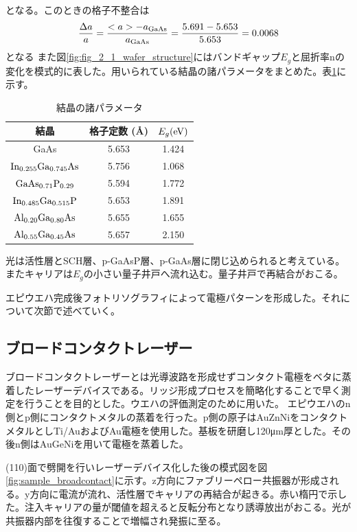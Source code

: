 となる。このときの格子不整合は
\begin{eqnarray}
\dfrac{\Delta a}{a}=\dfrac{<a> - a_{\rm{GaAs}}}{a_{\rm{GaAs}}}=\dfrac{5.691-5.653}{5.653}=0.0068
\end{eqnarray}
となる
また図\ref{fig:fig_2_1_wafer_structure}にはバンドギャップ$E_{g}$と屈折率nの変化を模式的に表した。用いられている結晶の諸パラメータをまとめた。表\ref{table:table_2_1_parameter}に示す。
\begin{table}[h]
  \caption{結晶の諸パラメータ}
    \label{table:table_2_1_parameter}
  \centering
  \begin{tabular}{ccc}
    \hline
      結晶&格子定数 (\AA) & $E_{g} (\rm{eV})$  \\
    \hline \hline
    GaAs  & 5.653&  1.424  \\
    $\rm{In_{0.255}Ga_{0.745}As}$&  5.756& 1.068  \\
    $\rm{GaAs_{0.71}P_{0.29}}$  &  5.594&1.772 \\
    $\rm{In_{0.485}Ga_{0.515}P}$& 5.653& 1.891\\
    $\rm{Al_{0.20}Ga_{0.80}As}$&5.655& 1.655\\
    $\rm{Al_{0.55}Ga_{0.45}As}$&5.657& 2.150\\
       \hline
  \end{tabular}
\end{table}

光は活性層とSCH層、p-GaAsP層、p-GaAs層に閉じ込められると考えている。またキャリアは$E_{g}$の小さい量子井戸へ流れ込む。量子井戸で再結合がおこる。

エピウエハ完成後フォトリソグラフィによって電極パターンを形成した。それについて次節で述べていく。

\subsection{ブロードコンタクトレーザー}%
ブロードコンタクトレーザーとは光導波路を形成せずコンタクト電極をベタに蒸着したレーザーデバイスである。リッジ形成プロセスを簡略化することで早く測定を行うことを目的とした。ウエハの評価測定のために用いた。
エピウエハのn側とp側にコンタクトメタルの蒸着を行った。p側の原子はAuZnNiをコンタクトメタルとしTi/AuおよびAu電極を使用した。基板を研磨し120\si{\micro\metre}厚とした。その後n側はAuGeNiを用いて電極を蒸着した。


(110)面で劈開を行いレーザーデバイス化した後の模式図を図\ref{fig:sample_broadcontact}に示す。z方向にファブリーペロー共振器が形成される。y方向に電流が流れ、活性層でキャリアの再結合が起きる。赤い楕円で示した。注入キャリアの量が閾値を超えると反転分布となり誘導放出がおこる。光が共振器内部を往復することで増幅され発振に至る。

